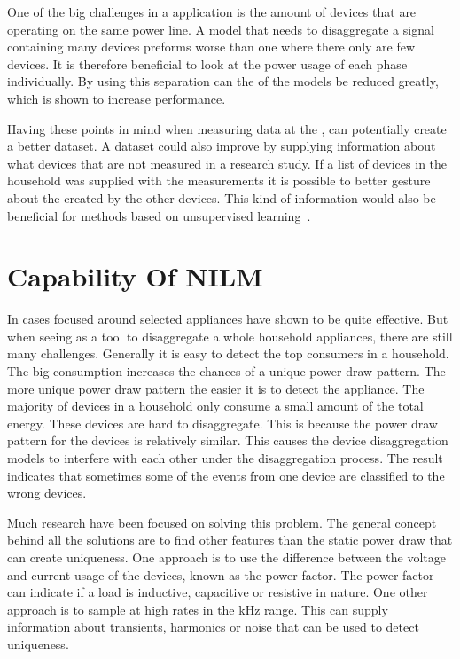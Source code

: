 One of the big challenges in a  application is the amount of devices that are operating on the same power line. A model that needs to disaggregate a signal containing many devices preforms worse than one where there only are few devices. It is therefore beneficial to look at the power usage of each phase individually. By using this separation can the  of the models be reduced greatly, which is shown to increase performance. 

Having these points in mind when measuring data at the , can potentially create a better dataset. A dataset could also improve by supplying information about what devices that are not measured in a research study. If a list of devices in the household was supplied with the measurements it is possible to better gesture about the  created by the other devices. This kind of information would also be beneficial for methods based on unsupervised learning~\citep{RefWorks:19}. 

\section{Capability Of NILM}
In cases focused around selected appliances have  shown to be quite effective. But when seeing  as a tool to disaggregate a whole household appliances, there are still many challenges. Generally it is easy to detect the top consumers in a household. The big consumption increases the chances of a unique power draw pattern. The more unique power draw pattern the easier it is to detect the appliance. The majority of devices in a household only consume a small amount of the total energy. These devices are hard to disaggregate. This is because the power draw pattern for the devices is relatively similar. This causes the device disaggregation models to interfere with each other under the disaggregation process. The result indicates that sometimes some of the events from one device are classified to the wrong devices. 

Much research have been focused on solving this problem. The general concept behind all the solutions are to find other features than the static power draw that can create uniqueness. One approach is to use the difference between the voltage and current usage of the devices, known as the power factor. The power factor can indicate if a load is inductive, capacitive or resistive in nature. One other approach is to sample at high rates in the kHz range. This can supply information about transients, harmonics or noise that can be used to detect uniqueness.

